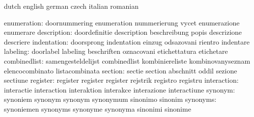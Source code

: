 \stopvariables




\startsetupvariables       dutch                     english
                           german                    czech
                           italian                   romanian

              enumeration: doornummering             enumeration
                           nummerierung              vycet
                           enumerazione              enumerare
              description: doordefinitie             description
                           beschreibung              popis
                           descrizione               descriere
              indentation: doorsprong                indentation
                           einzug                    odsazovani
                           rientro                   indentare
                 labeling: doorlabel                 labeling
                           beschriften               oznacovani
                           etichettatura             etichetare
             combinedlist: samengesteldelijst        combinedlist
                           kombiniereliste           kombinovanyseznam
                           elencocombinato           listacombinata
                  section: sectie                    section
                           abschnitt                 oddil
                           sezione                   sectiune
                 register: register                  register
                           register                  rejstrik
                           registro                  registru
              interaction: interactie                interaction
                           interaktion               interakce
                           interazione               interactiune
                  synonym: synoniem                  synonym
                           synonym                   synonymum
                           sinonimo                  sinonim
                 synonyms: synoniemen                synonyms
                           synonyme                  synonyma
                           sinonimi                  sinonime
